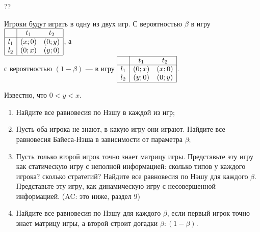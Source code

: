 \begin{problem}\par
\begin{source}\cite{polisci:lectures}?? \end{source}
Игроки будут играть в одну из двух игр.
С вероятностью  $\beta $ в игру  $\begin{array}{|c|cc|}  \hline {} & {t_{1} } & {t_{2} } \\  \hline {l_{1} } & {\left(x;0\right)} & {\left(0;y\right)} \\ {l_{2} } & {\left(0;x\right)} & {\left(y;0\right)} \\  \hline  \end{array}$, а  \\
с вероятностью  $\left(1-\beta \right)$  — в игру  $\begin{array}{|c|cc|}  \hline {} & {t_{1} } & {t_{2} } \\  \hline {l_{1} } & {\left(0;x\right)} & {\left(x;0\right)} \\ {l_{2} } & {\left(y;0\right)} & {\left(0;y\right)} \\  \hline  \end{array}$.

Известно, что  $0<y<x$.\par
\begin{enumerate}
\item	Найдите все равновесия по Нэшу в каждой из игр;\par
\item 	Пусть оба игрока не знают, в какую игру они играют. Найдите все равновесия Байеса-Нэша в зависимости от параметра  $\beta$;\par
\item 	Пусть только второй игрок точно знает матрицу игры. Представьте эту игру как статическую игру с неполной информацией: сколько типов у каждого игрока? сколько стратегий? Найдите все равновесия по Нэшу для каждого  $\beta $. Представьте эту игру, как динамическую игру с несовершенной информацией. ({\red AC: это ниже, раздел 9})\par
\item	Найдите все равновесия по Нэшу для каждого  $\beta $, если первый игрок точно знает матрицу игры, а второй строит догадки $\beta: (1-\beta)$.\par
\end{enumerate}


\begin{sol}

\end{sol}
\end{problem}



